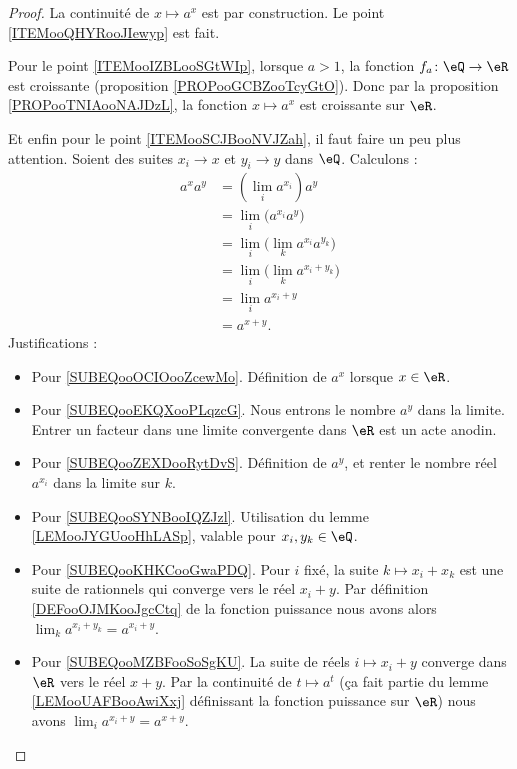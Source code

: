 \begin{proof}
    La continuité de \( x\mapsto a^x\) est par construction. Le point \ref{ITEMooQHYRooJIewyp} est fait.

    Pour le point \ref{ITEMooIZBLooSGtWIp}, lorsque \( a>1\), la fonction \( f_a\colon \eQ\to \eR\) est croissante (proposition \ref{PROPooGCBZooTcyGtO}). Donc par la proposition \ref{PROPooTNIAooNAJDzL}, la fonction \( x\mapsto a^x\) est croissante sur \( \eR\).

    Et enfin pour le point \ref{ITEMooSCJBooNVJZah}, il faut faire un peu plus attention. Soient des suites \( x_i\to x\) et \( y_i\to y\) dans \( \eQ\). Calculons :
    \begin{subequations}        \label{SUBEQSooMPNLooPoyjwJ}
        \begin{align}
            a^xa^y&=(\lim_ia^{x_i})a^y      \label{SUBEQooOCIOooZcewMo} \\
            &=\lim_i\big( a^{x_i}a^y \big)   \label{SUBEQooEKQXooPLqzcG}\\
            &=\lim_i\big( \lim_ka^{x_i}a^{y_k} \big)    \label{SUBEQooZEXDooRytDvS}\\
            &=\lim_i\big( \lim_k a^{x_i+y_k} \big)     \label{SUBEQooSYNBooIQZJzl}\\
            &=\lim_ia^{x_i+y}                           \label{SUBEQooKHKCooGwaPDQ}\\
            &=a^{x+y}.                                  \label{SUBEQooMZBFooSoSgKU}
        \end{align}
    \end{subequations}
    Justifications :
    \begin{itemize}
        \item Pour \ref{SUBEQooOCIOooZcewMo}. Définition de \( a^x\) lorsque \( x\in \eR\).
        \item Pour \ref{SUBEQooEKQXooPLqzcG}. Nous entrons le nombre \( a^y\) dans la limite. Entrer un facteur dans une limite convergente dans \( \eR\) est un acte anodin.
        \item Pour \ref{SUBEQooZEXDooRytDvS}. Définition de \( a^y\), et renter le nombre réel \( a^{x_i}\) dans la limite sur \( k\).
        \item Pour \ref{SUBEQooSYNBooIQZJzl}. Utilisation du lemme \ref{LEMooJYGUooHhLASp}, valable pour \( x_i,y_k\in \eQ\).
        \item Pour \ref{SUBEQooKHKCooGwaPDQ}. Pour \( i\) fixé, la suite \( k\mapsto x_i+x_k\) est une suite de rationnels qui converge vers le réel \( x_i+y\). Par définition \ref{DEFooOJMKooJgcCtq} de la fonction puissance nous avons alors \( \lim_ka^{x_i+y_k}=a^{x_i+y}\).
        \item Pour \ref{SUBEQooMZBFooSoSgKU}. La suite de réels \( i\mapsto x_i+y\) converge dans \( \eR\) vers le réel \( x+y\). Par la continuité de \( t\mapsto a^t\) (ça fait partie du lemme \ref{LEMooUAFBooAwiXxj} définissant la fonction puissance sur \( \eR\)) nous avons \( \lim_ia^{x_i+y}=a^{x+y}\).
    \end{itemize}


\end{proof}
